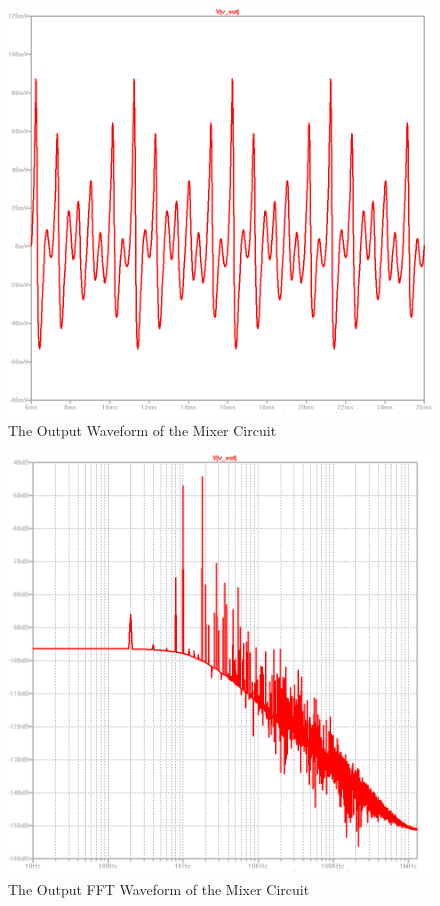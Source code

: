 \documentclass[paper]{IEEEtran}
\begin{document}
\begin{figure}[h!]
\setlength{\unitlength}{\textwidth}
\center 
\includegraphics[width=0.45\unitlength]{mixer_vo3.png}
\caption{\label{fig:mixervo} The Output Waveform of the Mixer Circuit }
\end{figure}	

\begin{figure}[h!]
\setlength{\unitlength}{\textwidth}
\center 
\includegraphics[width=0.45\unitlength]{mixer_fft3.png}
\caption{\label{fig:mixerfft} The Output FFT Waveform of the Mixer Circuit }
\end{figure}	
\end{document}
